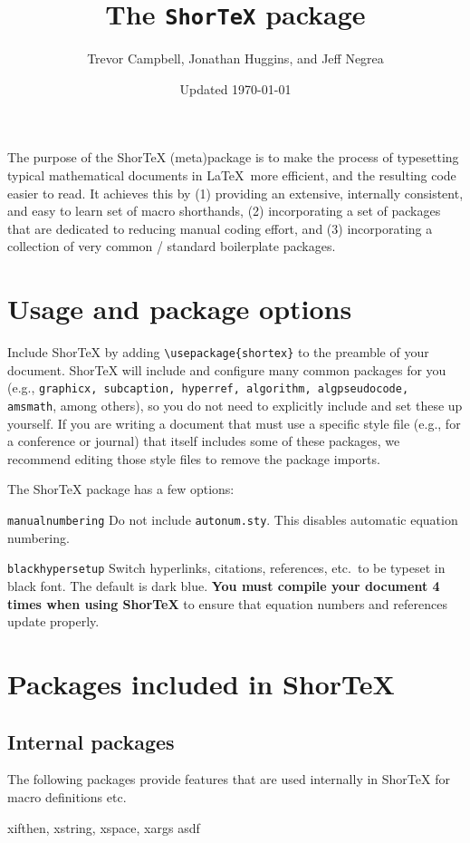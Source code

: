 \documentclass{article}
\title{The \texttt{ShorTeX} package}
\author{Trevor Campbell, Jonathan Huggins, and Jeff Negrea}
\date{Updated \today}
\begin{document}
\maketitle

\babs
The purpose of the ShorTeX (meta)package is to make the process of typesetting
typical mathematical documents in \LaTeX~more efficient, and the resulting
code easier to read.  It achieves this by 
(1) providing an
extensive, internally consistent, and easy to learn set of macro
shorthands, 
(2) incorporating a set of packages that are
dedicated to reducing manual coding effort, and
(3) incorporating a collection of very common / standard boilerplate packages.
\eabs

\section{Usage and package options}\label{sec:usage}


Include ShorTeX by adding \verb!\usepackage{shortex}! to the preamble of your document.
ShorTeX will include and configure many common packages for you (e.g., \texttt{graphicx, subcaption, hyperref, algorithm, algpseudocode, amsmath}, among others),
so you do not need to explicitly include and set these up yourself.
If you are writing a document that must use a specific style file (e.g., for a conference or journal) that itself
includes some of these packages, we recommend editing those style files to remove the package imports.

The ShorTeX package has a few options:
\bdesc
\item[\texttt{manualnumbering}] Do not include \texttt{autonum.sty}. This disables automatic equation numbering.
\item[\texttt{blackhypersetup}] Switch hyperlinks, citations, references, etc.~to be typeset in black font. The default is dark blue.
\edesc
\textbf{You must compile your document 4 times when using ShorTeX} to ensure that equation
numbers and references update properly.

\section{Packages included in ShorTeX}
\subsection{Internal packages}
The following packages provide features that are used internally in ShorTeX for 
macro definitions etc.
\bdesc
\item[xifthen, xstring, xspace, xargs] asdf
\edesc
\end{document}
